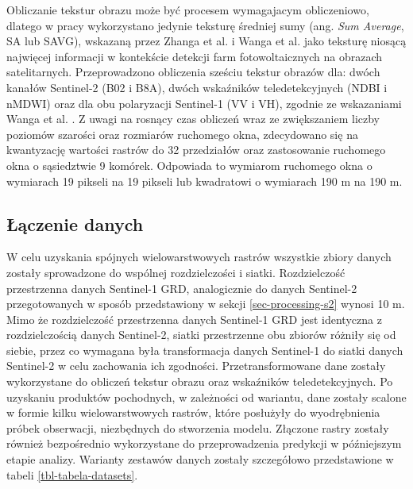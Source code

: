 \documentclass{amuthesis}
\begin{document}
Obliczanie tekstur obrazu może być procesem wymagajacym obliczeniowo,
dlatego w pracy wykorzystano jedynie teksturę średniej sumy (ang.
\emph{Sum Average}, SA lub SAVG), wskazaną przez Zhanga et al.
\autocite*{zhang_2021_texture} i Wanga et al. \autocite*{wang_2022_pv}
jako teksturę niosącą najwięcej informacji w kontekście detekcji farm
fotowoltaicznych na obrazach satelitarnych. Przeprowadzono obliczenia
sześciu tekstur obrazów dla: dwóch kanałów Sentinel-2 (B02 i B8A), dwóch
wskaźników teledetekcyjnych (NDBI i nMDWI) oraz dla obu polaryzacji
Sentinel-1 (VV i VH), zgodnie ze wskazaniami Wanga et al.
\autocite*{wang_2022_pv}. Z uwagi na rosnący czas obliczeń wraz ze
zwiększaniem liczby poziomów szarości oraz rozmiarów ruchomego okna,
zdecydowano się na kwantyzację wartości rastrów do 32 przedziałów oraz
zastosowanie ruchomego okna o sąsiedztwie 9 komórek. Odpowiada to
wymiarom ruchomego okna o wymiarach 19 pikseli na 19 pikseli lub
kwadratowi o wymiarach 190 m na 190 m.

\hypertarget{sec-processing-data-merging}{%
\subsection{Łączenie danych}\label{sec-processing-data-merging}}

W celu uzyskania spójnych wielowarstwowych rastrów wszystkie zbiory
danych zostały sprowadzone do wspólnej rozdzielczości i siatki.
Rozdzielczość przestrzenna danych Sentinel-1 GRD, analogicznie do danych
Sentinel-2 przegotowanych w sposób przedstawiony w sekcji
\ref{sec-processing-s2} wynosi 10 m. Mimo że rozdzielczość przestrzenna
danych Sentinel-1 GRD jest identyczna z rozdzielczością danych
Sentinel-2, siatki przestrzenne obu zbiorów różniły się od siebie, przez
co wymagana była transformacja danych Sentinel-1 do siatki danych
Sentinel-2 w celu zachowania ich zgodności. Przetransformowane dane
zostały wykorzystane do obliczeń tekstur obrazu oraz wskaźników
teledetekcyjnych. Po uzyskaniu produktów pochodnych, w zależności od
wariantu, dane zostały scalone w formie kilku wielowarstwowych rastrów,
które posłużyły do wyodrębnienia próbek obserwacji, niezbędnych do
stworzenia modelu. Złączone rastry zostały również bezpośrednio
wykorzystane do przeprowadzenia predykcji w późniejszym etapie analizy.
Warianty zestawów danych zostały szczegółowo przedstawione w tabeli
\ref{tbl-tabela-datasets}.
\end{document}
